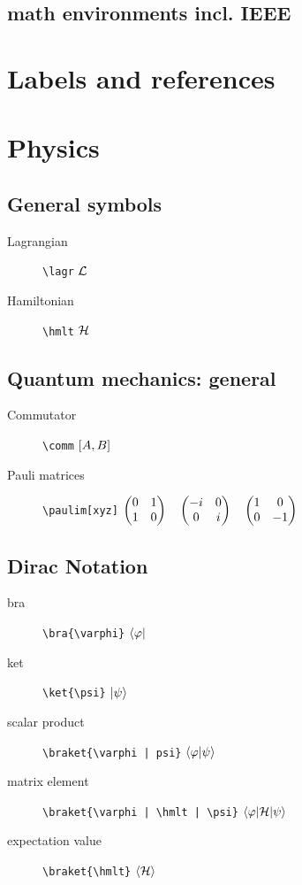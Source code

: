 \documentclass[a4paper]{article}
\begin{document}
\subsection{math environments incl. IEEE}


\section{Labels and references}

\section{Physics}

\subsection{General symbols}

\begin{description}
	\item[Lagrangian] \verb|\lagr| \quad $\mathcal{L}$
	\item[Hamiltonian] \verb|\hmlt| \quad $\mathcal{H}$
\end{description}


\subsection{Quantum mechanics: general}

\begin{description}
	\item[Commutator] \verb|\comm| \quad $\left[ A, B \right]$
	\item[Pauli matrices] \verb|\paulim[xyz]| \quad $\begin{pmatrix}0 & 1 \\ 1 & 0\end{pmatrix} \quad \begin{pmatrix}-i & 0 \\ 0 & i\end{pmatrix} \quad \begin{pmatrix}1 & 0 \\ 0 & -1\end{pmatrix}$
\end{description}


\subsection{Dirac Notation}

\begin{description}
	\item[bra] \verb|\bra{\varphi}| \quad $\bra{\varphi}$
	\item[ket] \verb|\ket{\psi}| \quad $\ket{\psi}$
	\item[scalar product] \verb+\braket{\varphi | psi}+ \quad $\braket{\varphi | \psi}$
	\item[matrix element] \verb+\braket{\varphi | \hmlt | \psi}+ \quad $\braket{\varphi | \mathcal{H} | \psi}$
	\item[expectation value] \verb+\braket{\hmlt}+ \quad $\braket{\mathcal{H}}$
\end{description}
\end{document}
